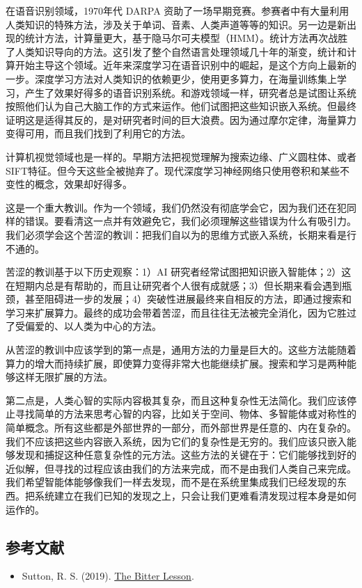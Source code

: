 在语音识别领域，1970年代 DARPA 资助了一场早期竞赛。参赛者中有大量利用人类知识的特殊方法，涉及关于单词、音素、人类声道等等的知识。另一边是新出现的统计方法，计算量更大，基于隐马尔可夫模型（HMM）。统计方法再次战胜了人类知识导向的方法。这引发了整个自然语言处理领域几十年的渐变，统计和计算开始主导这个领域。近年来深度学习在语音识别中的崛起，是这个方向上最新的一步。深度学习方法对人类知识的依赖更少，使用更多算力，在海量训练集上学习，产生了效果好得多的语音识别系统。和游戏领域一样，研究者总是试图让系统按照他们认为自己大脑工作的方式来运作。他们试图把这些知识嵌入系统。但最终证明这是适得其反的，是对研究者时间的巨大浪费。因为通过摩尔定律，海量算力变得可用，而且我们找到了利用它的方法。

计算机视觉领域也是一样的。早期方法把视觉理解为搜索边缘、广义圆柱体、或者SIFT特征。但今天这些全被抛弃了。现代深度学习神经网络只使用卷积和某些不变性的概念，效果却好得多。

这是一个重大教训。作为一个领域，我们仍然没有彻底学会它，因为我们还在犯同样的错误。要看清这一点并有效避免它，我们必须理解这些错误为什么有吸引力。我们必须学会这个苦涩的教训：把我们自以为的思维方式嵌入系统，长期来看是行不通的。

苦涩的教训基于以下历史观察：1）AI 研究者经常试图把知识嵌入智能体；2）这在短期内总是有帮助的，而且让研究者个人很有成就感；3）但长期来看会遇到瓶颈，甚至阻碍进一步的发展；4）突破性进展最终来自相反的方法，即通过搜索和学习来扩展算力。最终的成功会带着苦涩，而且往往无法被完全消化，因为它胜过了受偏爱的、以人类为中心的方法。

从苦涩的教训中应该学到的第一点是，通用方法的力量是巨大的。这些方法能随着算力的增大而持续扩展，即使算力变得非常大也能继续扩展。搜索和学习是两种能够这样无限扩展的方法。

第二点是，人类心智的实际内容极其复杂，而且这种复杂性无法简化。我们应该停止寻找简单的方法来思考心智的内容，比如关于空间、物体、多智能体或对称性的简单概念。所有这些都是外部世界的一部分，而外部世界是任意的、内在复杂的。我们不应该把这些内容嵌入系统，因为它们的复杂性是无穷的。我们应该只嵌入能够发现和捕捉这种任意复杂性的元方法。这些方法的关键在于：它们能够找到好的近似解，但寻找的过程应该由我们的方法来完成，而不是由我们人类自己来完成。我们希望智能体能够像我们一样去发现，而不是在系统里集成我们已经发现的东西。把系统建立在我们已知的发现之上，只会让我们更难看清发现过程本身是如何运作的。

\hypertarget{the-bitter-lesson-references}{%
\subsection{参考文献}\label{the-bitter-lesson-references}}

\begin{itemize}
\tightlist
\item
  Sutton, R. S. (2019). \href{http://www.incompleteideas.net/IncIdeas/BitterLesson.html}{The Bitter Lesson}.
\end{itemize}

\clearpage

